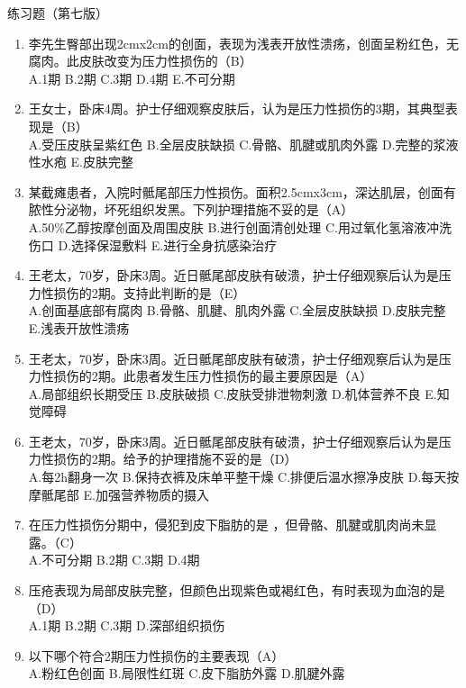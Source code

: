\documentclass[11pt, a4paper]{ctexart}
\begin{document}
\begin{examplebox}{练习题（第七版）}
\begin{enumerate}
    \item 李先生臀部出现2cmx2cm的创面，表现为浅表开放性溃疡，创面呈粉红色，无腐肉。此皮肤改变为压力性损伤的（B）\\
    A.1期 \quad B.2期 \quad C.3期 \quad D.4期 \quad E.不可分期
    \item 王女士，卧床4周。护士仔细观察皮肤后，认为是压力性损伤的3期，其典型表现是（B）\\
    A.受压皮肤呈紫红色 \quad B.全层皮肤缺损 \quad C.骨骼、肌腱或肌肉外露 \quad D.完整的浆液性水疱 \quad E.皮肤完整
    \item 某截瘫患者，入院时骶尾部压力性损伤。面积2.5cmx3cm，深达肌层，创面有脓性分泌物，坏死组织发黑。下列护理措施不妥的是（A）\\
    A.50\%乙醇按摩创面及周围皮肤 \quad B.进行创面清创处理 \quad C.用过氧化氢溶液冲洗伤口 \quad D.选择保湿敷料 \quad E.进行全身抗感染治疗
    \item 王老太，70岁，卧床3周。近日骶尾部皮肤有破溃，护士仔细观察后认为是压力性损伤的2期。支持此判断的是（E）\\
    A.创面基底部有腐肉 \quad B.骨骼、肌腱、肌肉外露 \quad C.全层皮肤缺损 \quad D.皮肤完整 \quad E.浅表开放性溃疡
    \item 王老太，70岁，卧床3周。近日骶尾部皮肤有破溃，护士仔细观察后认为是压力性损伤的2期。此患者发生压力性损伤的最主要原因是（A）\\
    A.局部组织长期受压 \quad B.皮肤破损 \quad C.皮肤受排泄物刺激 \quad D.机体营养不良 \quad E.知觉障碍
    \item 王老太，70岁，卧床3周。近日骶尾部皮肤有破溃，护士仔细观察后认为是压力性损伤的2期。给予的护理措施不妥的是（D）\\
    A.每2h翻身一次 \quad B.保持衣裤及床单平整干燥 \quad C.排便后温水擦净皮肤 \quad D.每天按摩骶尾部 \quad E.加强营养物质的摄入
    \item 在压力性损伤分期中，侵犯到皮下脂肪的是 ，但骨骼、肌腱或肌肉尚未显露。（C）\\
    A.不可分期 \quad B.2期 \quad C.3期 \quad D.4期
    \item 压疮表现为局部皮肤完整，但颜色出现紫色或褐红色，有时表现为血泡的是（D）\\
    A.1期 \quad B.2期 \quad C.3期 \quad D.深部组织损伤
    \item 以下哪个符合2期压力性损伤的主要表现（A）\\
    A.粉红色创面 \quad B.局限性红斑 \quad C.皮下脂肪外露 \quad D.肌腱外露

\end{enumerate}
\end{examplebox}
\end{document}

